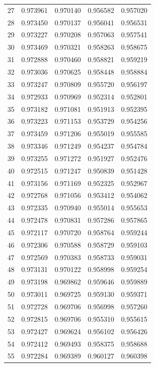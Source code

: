 \begin{table}
\begin{tabular}{rrrrr}
27 & 0.973961 & 0.970140 & 0.956582 & 0.957020 \\
28 & 0.973450 & 0.970137 & 0.956041 & 0.956531 \\
29 & 0.973227 & 0.970208 & 0.957063 & 0.957541 \\
30 & 0.973469 & 0.970321 & 0.958263 & 0.958675 \\
31 & 0.972888 & 0.970460 & 0.958821 & 0.959219 \\
32 & 0.973036 & 0.970625 & 0.958448 & 0.958884 \\
33 & 0.973247 & 0.970809 & 0.955720 & 0.956197 \\
34 & 0.972933 & 0.970969 & 0.952314 & 0.952801 \\
35 & 0.973182 & 0.971081 & 0.951913 & 0.952395 \\
36 & 0.973223 & 0.971153 & 0.953729 & 0.954256 \\
37 & 0.973459 & 0.971206 & 0.955019 & 0.955585 \\
38 & 0.973346 & 0.971249 & 0.954237 & 0.954784 \\
39 & 0.973255 & 0.971272 & 0.951927 & 0.952476 \\
40 & 0.972515 & 0.971247 & 0.950839 & 0.951428 \\
41 & 0.973156 & 0.971169 & 0.952325 & 0.952967 \\
42 & 0.972768 & 0.971056 & 0.953412 & 0.954062 \\
43 & 0.972335 & 0.970940 & 0.955014 & 0.955653 \\
44 & 0.972478 & 0.970831 & 0.957286 & 0.957865 \\
45 & 0.972117 & 0.970720 & 0.958764 & 0.959244 \\
46 & 0.972306 & 0.970588 & 0.958729 & 0.959103 \\
47 & 0.972569 & 0.970383 & 0.958733 & 0.959031 \\
48 & 0.973131 & 0.970122 & 0.958998 & 0.959254 \\
49 & 0.973198 & 0.969862 & 0.959646 & 0.959889 \\
50 & 0.973011 & 0.969725 & 0.959130 & 0.959371 \\
51 & 0.972728 & 0.969706 & 0.956998 & 0.957260 \\
52 & 0.972815 & 0.969706 & 0.955310 & 0.955615 \\
53 & 0.972427 & 0.969624 & 0.956102 & 0.956426 \\
54 & 0.972412 & 0.969493 & 0.958375 & 0.958688 \\
55 & 0.972284 & 0.969389 & 0.960127 & 0.960398 \\

\end{tabular}
\end{table}

